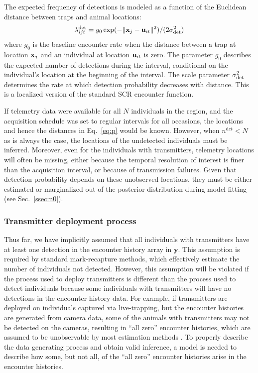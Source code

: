 \documentclass[12pt]{article}
\newcommand{\bx}{{\bf x}}
\newcommand{\buit}{{\bf u}_{it}}
\begin{document}
The expected frequency of detections is modeled as a function of
the Euclidean distance between traps and animal locations:
\begin{equation}
  \lambda^{\rm det}_{ijt} = g_0\exp(-\|\bx_{j}-\buit\|^2)/(2\sigma_{\rm det}^2)
  \label{eq:p}
\end{equation}
where $g_0$ is the baseline encounter rate when the distance between
a trap at location $\bx_j$ and an individual at location
$\buit$ is zero. The parameter $g_0$ describes the expected number of 
detections during the interval, conditional on the individual's
location at the beginning of the interval.
The scale parameter $\sigma_{\rm det}^2$ determines
the rate at which detection probability decreases with distance. This is a
localized version of the standard SCR encounter function.

If telemetry data were available for all $N$ individuals in the
region, and the acquisition schedule was set to regular intervals for
all occasions, the locations and hence the distances in Eq.~\ref{eq:p}
would be known. However, when $n^{\mathrm det}<N$ as is always the case, the
locations of the undetected individuals must be inferred. Moreover,
even for the individuals with transmitters, telemetry locations will often
be missing, either because the temporal resolution of interest is
finer than the acquisition interval, or because of transmission
failures. Given that detection probability depends on these unobserved
locations, they must be either estimated or marginalized out of the posterior
distribution during model fitting (see Sec.~\ref{ssec:n0}).

\subsubsection{Transmitter deployment process}
\label{ssec:tr-deploy}

Thus far, we have implicitly assumed that all 
individuals with transmitters have at least one detection in the encounter history
array in $\bm y$. This assumption is required by standard mark-recapture
methods, which effectively estimate the number of individuals not
detected. %
However, this assumption will be violated if
the process used to deploy transmitters is different than the process
used to detect individuals because some individuals with transmitters
will have no detections in the encounter history data. For example, if
transmitters are deployed on individuals captured via live-trapping,
but the encounter histories are generated from camera data, some of
the animals with transmitters may not be detected on the cameras,
resulting in ``all zero'' encounter histories, which are assumed to be
unobservable by most estimation methods \citep{williams_etal:2002}. To
properly describe the data generating process and obtain
valid inference, a model is needed to describe how some, but not all,
of the ``all zero'' encounter histories arise in the encounter
histories. 
\end{document}
